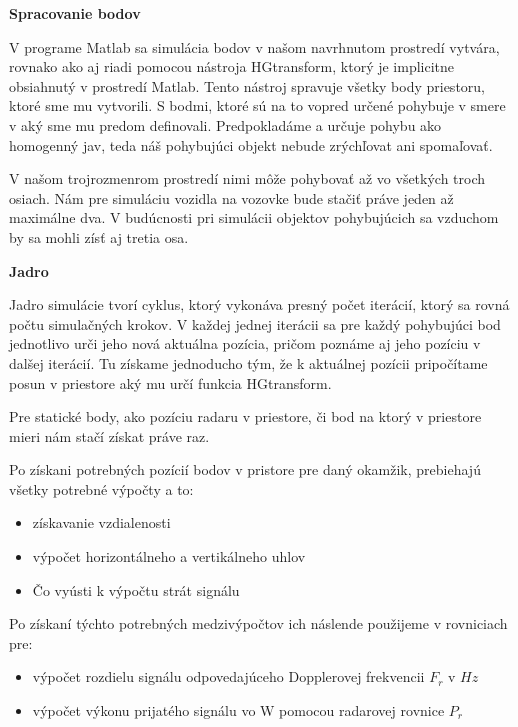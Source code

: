     \textbf{Spracovanie bodov}

    V programe Matlab sa simulácia bodov v našom navrhnutom prostredí vytvára, rovnako ako aj riadi pomocou nástroja HGtransform, ktorý je implicitne obsiahnutý v prostredí Matlab. Tento nástroj spravuje všetky body priestoru, ktoré sme mu vytvorili. S bodmi, ktoré sú na to vopred určené pohybuje v smere v aký sme mu predom definovali. Predpokladáme a určuje pohybu ako homogenný jav, teda náš pohybujúci objekt nebude zrýchľovat ani spomaľovať.

    V našom trojrozmenrom prostredí nimi môže pohybovať až vo všetkých troch osiach. Nám pre simuláciu vozidla na vozovke bude stačiť práve jeden až maximálne dva. V budúcnosti pri simulácii objektov pohybujúcich sa vzduchom by sa mohli zísť aj tretia osa.\newline    

    \textbf{Jadro}

    Jadro simulácie tvorí cyklus, ktorý vykonáva presný počet iterácií, ktorý sa rovná počtu simulačných krokov. V každej jednej iterácii sa pre každý pohybujúci bod jednotlivo urči jeho nová aktuálna pozícia, pričom poznáme aj jeho pozíciu v dalšej iterácií. Tu získame jednoducho tým, že k aktuálnej pozícii pripočítame posun v priestore aký mu určí funkcia HGtransform. 

    Pre statické body, ako pozíciu radaru v priestore, či bod na ktorý v priestore mieri nám stačí získat práve raz.
    \newline

    Po získani potrebných pozícií bodov v pristore pre daný okamžik, prebiehajú všetky potrebné výpočty a to:
    \begin{itemize} 
      \item získavanie vzdialenosti
      \item výpočet horizontálneho a vertikálneho uhlov
      \item Čo vyústi k výpočtu strát signálu
    \end{itemize}

    Po získaní týchto potrebných medzivýpočtov ich náslende použijeme v rovniciach pre:

    \begin{itemize}
      \item výpočet rozdielu signálu odpovedajúceho Dopplerovej frekvencii $F_{r}$ v $Hz$
      \item výpočet výkonu prijatého signálu vo W pomocou radarovej rovnice $P_{r}$
    \end{itemize}

